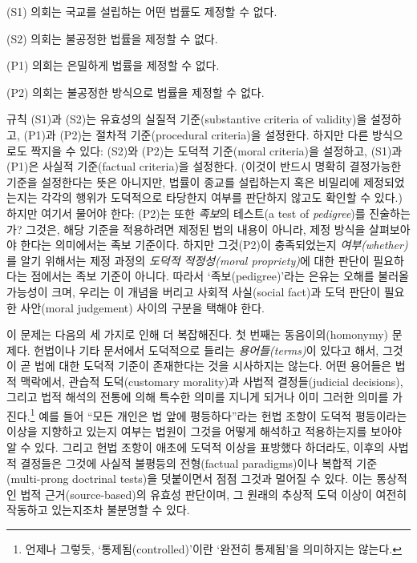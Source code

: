 \documentclass[12pt, oneside]{book}  %
\begin{document}
(S1) 의회는 국교를 설립하는 어떤 법률도 제정할 수 없다.

(S2) 의회는 불공정한 법률을 제정할 수 없다.

(P1) 의회는 은밀하게 법률을 제정할 수 없다.

(P2) 의회는 불공정한 방식으로 법률을 제정할 수 없다.

규칙 (S1)과 (S2)는 유효성의 실질적 기준(substantive criteria of
validity)을 설정하고, (P1)과 (P2)는 절차적 기준(procedural criteria)을
설정한다. 하지만 다른 방식으로도 짝지을 수 있다: (S2)와 (P2)는 도덕적
기준(moral criteria)을 설정하고, (S1)과 (P1)은 사실적 기준(factual
criteria)을 설정한다. (이것이 반드시 명확히 결정가능한 기준을 설정한다는
뜻은 아니지만, 법률이 종교를 설립하는지 혹은 비밀리에 제정되었는지는
각각의 행위가 도덕적으로 타당한지 여부를 판단하지 않고도 확인할 수
있다.) 하지만 여기서 물어야 한다: (P2)는 또한 \emph{족보}의 테스트(a
test of \emph{pedigree})를 진술하는가? 그것은, 해당 기준을 적용하려면
제정된 법의 내용이 아니라, 제정 방식을 살펴보아야 한다는 의미에서는 족보
기준이다. 하지만 그것(P2)이 충족되었는지 \emph{여부(whether)}를 알기
위해서는 제정 과정의 \emph{도덕적 적정성(moral propriety)}에 대한 판단이
필요하다는 점에서는 족보 기준이 아니다. 따라서 `족보(pedigree)'라는
은유는 오해를 불러올 가능성이 크며, 우리는 이 개념을 버리고 사회적
사실(social fact)과 도덕 판단이 필요한 사안(moral judgement) 사이의
구분을 택해야 한다.

이 문제는 다음의 세 가지로 인해 더 복잡해진다. 첫 번째는
동음이의(homonymy) 문제다. 헌법이나 기타 문서에서 도덕적으로 들리는
\emph{용어들(terms)}이 있다고 해서, 그것이 곧 법에 대한 도덕적 기준이
존재한다는 것을 시사하지는 않는다. 어떤 용어들은 법적 맥락에서, 관습적
도덕(customary morality)과 사법적 결정들(judicial decisions), 그리고
법적 해석의 전통에 의해 특수한 의미를 지니게 되거나 이미 그러한 의미를
가진다.\footnote{언제나 그렇듯, `통제됨(controlled)'이란 `완전히
  통제됨'을 의미하지는 않는다.} 예를 들어 ``모든 개인은 법 앞에
평등하다''라는 헌법 조항이 도덕적 평등이라는 이상을 지향하고 있는지
여부는 법원이 그것을 어떻게 해석하고 적용하는지를 보아야 알 수 있다.
그리고 헌법 조항이 애초에 도덕적 이상을 표방했다 하더라도, 이후의 사법적
결정들은 그것에 사실적 불평등의 전형(factual paradigms)이나 복합적
기준(multi-prong doctrinal tests)을 덧붙이면서 점점 그것과 멀어질 수
있다. 이는 통상적인 법적 근거(source-based)의 유효성 판단이며, 그 원래의
추상적 도덕 이상이 여전히 작동하고 있는지조차 불분명할 수 있다.
\end{document}
